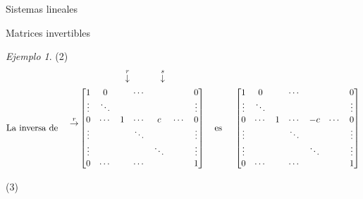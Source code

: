 \documentclass[a4paper,12pt,twoside,spanish,reqno]{amsbook}
\numberwithin{equation}{section}
\theoremstyle{definition}
\theoremstyle{remark}
\newtheorem*{ejemplo*}{Ejemplo}
\begin{document}
\begin{chapter}{Sistemas lineales}
\begin{section}{Matrices invertibles}
\begin{ejemplo*}
            (2)
            \begin{align*}
            &\begin{matrix}
            {}^{}&{}^{}&{}^{}&{}^{}&{}^{}&\overset{r}{\downarrow}&{}^{}&{}^{}&{}^{}{}^{}\overset{s}{\downarrow}&{}^{}
            \end{matrix} \\
            \text{La inversa de \quad}\begin{matrix}
            {}^{}\\{}^{}\\
            \overset{r}{\to}\\
            {}^{}\\
            {}^{}\\
            {}^{}
            \end{matrix}
            &\begin{bmatrix}
            1 & 0 &  &\cdots &&& 0  \\
            \vdots  & \ddots  & & &&& \vdots \\
            0 & \cdots &1 &\cdots&c&\cdots &0 \\
            \vdots  &   & &\ddots &&& \vdots \\
            \vdots  &   & & &\ddots&& \vdots \\
            0  & \cdots  & &\cdots &&& 1
            \end{bmatrix}
            \text{\quad es \quad}
            \begin{bmatrix}
            1 & 0 &  &\cdots &&& 0  \\
            \vdots  & \ddots  & & &&& \vdots \\
            0 & \cdots &1 &\cdots&-c&\cdots &0 \\
            \vdots  &   & &\ddots &&& \vdots \\
            \vdots  &   & & &\ddots&& \vdots \\
            0  & \cdots  & &\cdots &&& 1
            \end{bmatrix}
            \end{align*}
            
            (3)
            

\end{ejemplo*}
\end{section}
\end{chapter}
\end{document}
